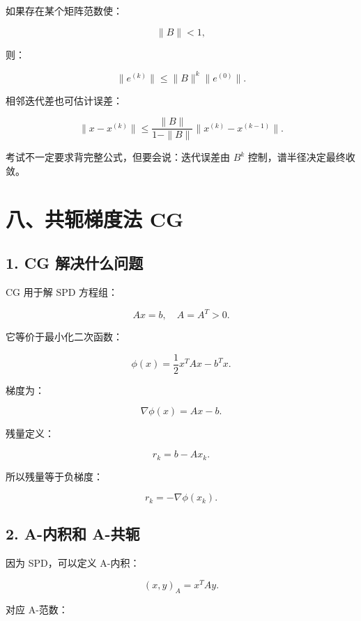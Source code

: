 \documentclass[11pt,a4paper]{ctexart}
\newcommand{\code}[1]{\begingroup\ttfamily\small #1\endgroup}
\begin{document}

如果存在某个矩阵范数使：

\[
\|B\|<1,
\]

则：

\[
\|e^{(k)}\|\le \|B\|^k\|e^{(0)}\|.
\]

相邻迭代差也可估计误差：

\[
\|x-x^{(k)}\|\le \frac{\|B\|}{1-\|B\|}\|x^{(k)}-x^{(k-1)}\|.
\]

考试不一定要求背完整公式，但要会说：迭代误差由 $B^k$ 控制，谱半径决定最终收敛。


\section*{八、共轭梯度法 CG}



\subsection*{1. CG 解决什么问题}


CG 用于解 SPD 方程组：

\[
Ax=b,\quad A=A^T>0.
\]

它等价于最小化二次函数：

\[
\phi(x)=\frac12 x^TAx-b^Tx.
\]

梯度为：

\[
\nabla\phi(x)=Ax-b.
\]

残量定义：

\[
r_k=b-Ax_k.
\]

所以残量等于负梯度：

\[
r_k=-\nabla\phi(x_k).
\]


\subsection*{2. A-内积和 A-共轭}


因为 \code{} SPD，可以定义 A-内积：

\[
(x,y)_A=x^TAy.
\]

对应 A-范数：
\end{document}
